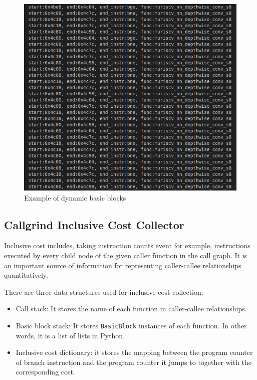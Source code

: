 \begin{figure}
    \centering
    \includegraphics[width=\linewidth]{figures/Basic_Block.png}
    \caption{Example of dynamic basic blocks}
    \label{fig:basic_block}
\end{figure}

\subsection{Callgrind Inclusive Cost Collector}
\label{sec:inclusive_cost}

Inclusive cost includes, taking instruction counts event for example, instructions executed by every child node of the given caller function in the call graph. It is an important source of information for representing caller-callee relationships quantitatively.

\medskip

There are three data structures used for inclusive cost collection:

\begin{itemize}
    \item Call stack: It stores the name of each function in caller-callee relationships.
    \item Basic block stack: It stores \texttt{BasicBlock} instances of each function. In other words, it is a list of lists in Python. 
    \item Inclusive cost dictionary: it stores the mapping between the program counter of branch instruction and the program counter it jumps to together with the corresponding cost. 
\end{itemize}

